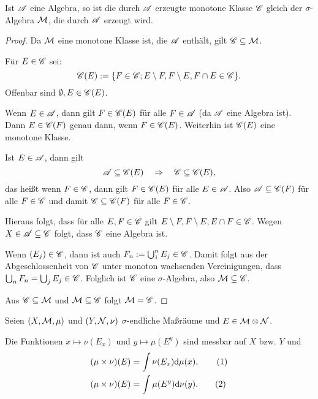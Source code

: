 \begin{lem}
 Ist $\mathscr{A}$ eine Algebra, so ist die durch $\mathscr{A}$ erzeugte monotone Klasse $\mathscr{C}$ gleich der $\sigma$-Algebra $\mathcal{M}$, die durch $\mathscr{A}$ erzeugt wird.
\end{lem}

\begin{proof}
 Da $\mathcal{M}$ eine monotone Klasse ist, die $\mathscr{A}$ enthält, gilt $\mathscr{C} \subseteq \mathcal{M}$. 
 
 Für $E \in \mathscr{C}$ sei:
 \[ \mathscr{C}(E) := \{ F \in \mathscr{C}; E \setminus F, F \setminus E, F \cap E \in \mathscr{C} \}. \]
 Offenbar sind $\emptyset, E \in \mathscr{C}(E)$.
 
 Wenn $E \in \mathscr{A}$, dann gilt $F \in \mathscr{C}(E)$ für alle $F \in \mathscr{A}$ (da $\mathscr{A}$ eine Algebra ist). Dann $E \in \mathscr{C}(F)$ genau dann, wenn $F \in \mathscr{C}(E)$. Weiterhin ist $\mathscr{C}(E)$ eine monotone Klasse. 
 
 Ist $E \in \mathscr{A}$, dann gilt 
 \[ \mathscr{A} \subseteq \mathscr{C}(E) \quad \Rightarrow \quad \mathscr{C} \subseteq \mathscr{C}(E), \]
 das heißt wenn $F \in \mathscr{C}$, dann gilt $F \in \mathscr{C}(E)$ für alle $E \in \mathscr{A}$. Also $\mathscr{A} \subseteq \mathscr{C}(F)$ für alle $F \in \mathscr{C}$ und damit $\mathscr{C} \subseteq \mathscr{C}(F)$ für alle $F \in \mathscr{C}$.
 
 Hieraus folgt, dass für alle $E,F \in \mathscr{C}$ gilt $E \setminus F, F \setminus E, E \cap F \in \mathscr{C}$. Wegen $X \in \mathscr{A} \subseteq \mathscr{C}$ folgt, dass $\mathscr{C}$ eine Algebra ist. 
 
 Wenn $(E_j) \in \mathscr{C}$, dann ist auch $F_n := \bigcup_1^n E_j \in \mathscr{C}$. Damit folgt aus der Abgeschlossenheit von $\mathscr{C}$ unter monoton wachsenden Vereinigungen, dass $\bigcup_n F_n = \bigcup_j E_j \in \mathscr{C}$. Folglich ist $\mathscr{C}$ eine $\sigma$-Algebra, also $\mathcal{M} \subseteq \mathscr{C}$.
 
 Aus $\mathscr{C} \subseteq \mathcal{M}$ und $\mathcal{M} \subseteq \mathscr{C}$ folgt $\mathcal{M} = \mathscr{C}$.
\end{proof}

\begin{thm}
 Seien $(X,\mathcal{M},\mu)$ und $(Y,\mathcal{N},\nu)$ $\sigma$-endliche Maßräume und $E \in \mathcal{M} \otimes \mathcal{N}$.
 
 Die Funktionen $x \mapsto \nu(E_x)$ und $y \mapsto \mu(E^y)$ sind messbar auf $X$ bzw. $Y$ und
 \begin{align*}
  (\mu \times\nu)(E) &= \int \nu(E_x) \mathrm{d} \mu(x), \tag{1} \\
  (\mu \times\nu)(E) &= \int \mu(E^y) \mathrm{d} \nu(y). \tag{2}
 \end{align*}
\end{thm}

